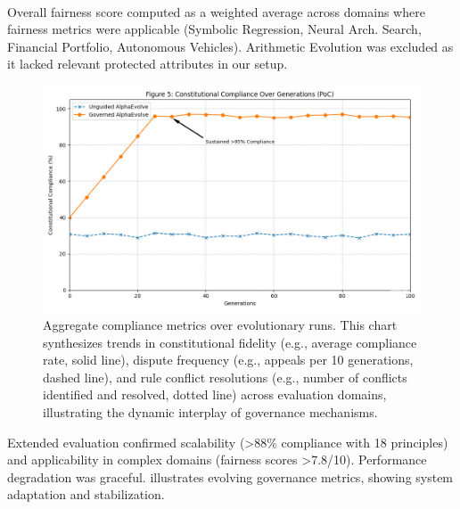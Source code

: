 \documentclass[manuscript,screen,review,anonymous,9pt]{acmart}
\begin{document}
\begin{table}[htbp]
\begin{minipage}{\linewidth}\footnotesize \textsuperscript{\dag}Overall fairness score computed as a weighted average across domains where fairness metrics were applicable (Symbolic Regression, Neural Arch. Search, Financial Portfolio, Autonomous Vehicles). Arithmetic Evolution was excluded as it lacked relevant protected attributes in our setup.\end{minipage}
\end{table}

\begin{figure}[htbp]
\centering
\includegraphics[width=\linewidth,keepaspectratio]{figs/Figure_5_compliance_generations.png}
\caption{Aggregate compliance metrics over evolutionary runs. This chart synthesizes trends in constitutional fidelity (e.g., average compliance rate, solid line), dispute frequency (e.g., appeals per 10 generations, dashed line), and rule conflict resolutions (e.g., number of conflicts identified and resolved, dotted line) across evaluation domains, illustrating the dynamic interplay of governance mechanisms.}
\label{fig:compliance-trends}
\end{figure}
Extended evaluation confirmed scalability (>88\% compliance with 18 principles) and applicability in complex domains (fairness scores >7.8/10). Performance degradation was graceful.  illustrates evolving governance metrics, showing system adaptation and stabilization.
\end{document}
